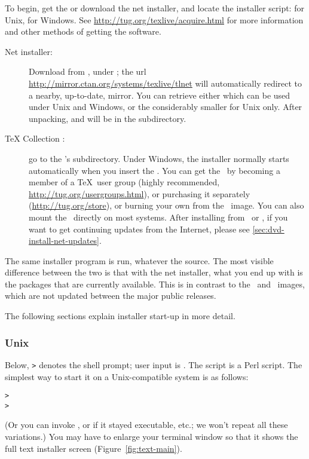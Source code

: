 \documentclass{article}
\begin{document}
To begin, get the \TK{} \DVD{} or download the \TL{} net installer, and
locate the installer script:  for Unix,
 for Windows.  See
\url{http://tug.org/texlive/acquire.html} for more information and other
methods of getting the software.

\begin{description}
\item [Net installer:] Download from \CTAN, under
; the url
\url{http://mirror.ctan.org/systems/texlive/tlnet} will automatically
redirect to a nearby, up-to-date, mirror.  You can retrieve either
 which can be used under Unix and Windows, or
the considerably smaller  for Unix
only. After unpacking,  and
 will be in the 
subdirectory.

\item [\TeX{} Collection \DVD:] go to the \DVD's 
subdirectory. Under Windows, the installer normally starts automatically
when you insert the \DVD.  You can get the \DVD\ by becoming a member of
a \TeX\ user group (highly recommended,
\url{http://tug.org/usergroups.html}), or purchasing it separately
(\url{http://tug.org/store}), or burning your own from the \ISO\ image.
You can also mount the \ISO\ directly on most systems.  After installing
from \DVD\ or \ISO, if you want to get continuing updates from the
Internet, please see \ref{sec:dvd-install-net-updates}.

\end{description}

The same installer program is run, whatever the source.  The most
visible difference between the two is that with the net installer, what
you end up with is the packages that are currently available.  This is
in contrast to the \DVD\ and \ISO\ images, which are not updated between
the major public releases.

\noindent
The following sections explain installer start-up in more detail.

\subsubsection{Unix}

Below, \texttt{>} denotes the shell prompt; user input is
.
The script  is a Perl script.  The simplest way
to start it on a Unix-compatible system is as follows:
\begin{alltt}
> 
> 
\end{alltt}
(Or you can invoke , or
 if it stayed executable, etc.; we won't repeat all
these variations.)  You may have to enlarge your terminal window so
that it shows the full text installer screen (Figure~\ref{fig:text-main}).
\end{document}
